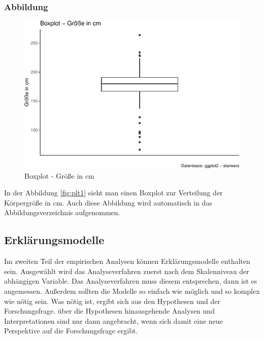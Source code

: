 \documentclass[
  12pt,
]{article}
\begin{document}
\hypertarget{abbildung}{%
\subsubsection{Abbildung}\label{abbildung}}

\begin{figure}

{\centering \includegraphics{thesis_files/figure-latex/unnamed-chunk-8-1} 

}

\caption{\label{fig:plt1}Boxplot - Größe in cm}\label{fig:unnamed-chunk-8}
\end{figure}

In der Abbildung \ref{fig:plt1} sieht man einen Boxplot zur Verteilung
der Körpergröße in cm. Auch diese Abbildung wird automatisch in das
Abbildungsverzeichnis aufgenommen.

\hypertarget{erkluxe4rungsmodelle}{%
\subsection{Erklärungsmodelle}\label{erkluxe4rungsmodelle}}

Im zweiten Teil der empirischen Analysen können Erklärungsmodelle
enthalten sein. Ausgewählt wird das Analyseverfahren zuerst nach dem
Skalenniveau der abhängigen Variable. Das Analyseverfahren muss diesem
entsprechen, dann ist es angemessen. Außerdem sollten die Modelle so
einfach wie möglich und so komplex wie nötig sein. Was nötig ist, ergibt
sich aus den Hypothesen und der Forschungsfrage. über die Hypothesen
hinausgehende Analysen und Interpretationen sind nur dann angebracht,
wenn sich damit eine neue Perspektive auf die Forschungsfrage ergibt.
\end{document}
